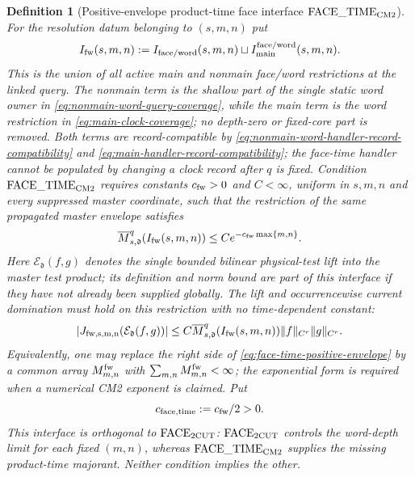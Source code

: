 \documentclass[11pt]{article}
\newtheorem{definition}[theorem]{Definition}
\begin{document}
\begin{definition}[Positive-envelope product-time face interface
$\mathrm{FACE\_TIME}_{\rm CM2}$]
\label{def:face-time-cm2}
For the resolution datum belonging to $(s,m,n)$ put
\[
 I_{\rm fw}(s,m,n):=I_{\rm face/word}(s,m,n)
 \sqcup I_{\rm main}^{\rm face/word}(s,m,n).
\]
This is the union of \emph{all} active main and nonmain face/word
restrictions at the linked query.  The nonmain term is the shallow part of
the single static word owner in
\eqref{eq:nonmain-word-query-coverage}, while the main term is the word
restriction in \eqref{eq:main-clock-coverage}; no depth-zero or fixed-core
part is removed.  Both terms are record-compatible by
\eqref{eq:nonmain-word-handler-record-compatibility} and
\eqref{eq:main-handler-record-compatibility}; the face-time handler cannot
be populated by changing a clock record after $q$ is fixed.
Condition $\mathrm{FACE\_TIME}_{\rm CM2}$ requires constants
$c_{\rm fw}>0$ and $C<\infty$, uniform in $s,m,n$ and every suppressed
master coordinate, such that the restriction of the same propagated master
envelope satisfies
\begin{equation}
\label{eq:face-time-positive-envelope}
 \overline M_{s,\mathfrak d}^{q}(I_{\rm fw}(s,m,n))
 \le C e^{-c_{\rm fw}\max\{m,n\}}.
\end{equation}
Here $\mathcal E_{\mathfrak d}(f,g)$ denotes the single bounded bilinear physical-test lift
into the master test product; its definition and norm bound are part of this
interface if they have not already been supplied globally.  The lift and
occurrencewise current domination must hold on this restriction with no
time-dependent constant:
\begin{equation}
\label{eq:face-time-test-lift}
 |J_{\rm fw,s,m,n}(\mathcal E_{\mathfrak d}(f,g))|
 \le C\overline M_{s,\mathfrak d}^{q}(I_{\rm fw}(s,m,n))
 \|f\|_{C^r}\|g\|_{C^r}.
\end{equation}
Equivalently, one may replace the right side of
\eqref{eq:face-time-positive-envelope} by a common array $M_{m,n}^{\rm fw}$
with $\sum_{m,n}M_{m,n}^{\rm fw}<\infty$; the exponential form is required
when a numerical CM2 exponent is claimed.  Put
\begin{equation}
\label{eq:face-time-rate}
 c_{\rm face,time}:=c_{\rm fw}/2>0.
\end{equation}
This interface is orthogonal to $\mathrm{FACE}_{\rm 2CUT}$:
$\mathrm{FACE}_{\rm 2CUT}$ controls the word-depth limit for each fixed
$(m,n)$, whereas $\mathrm{FACE\_TIME}_{\rm CM2}$ supplies the missing
product-time majorant.  Neither condition implies the other.
\end{definition}
\end{document}
